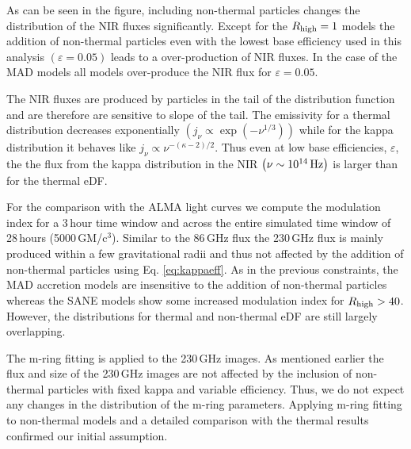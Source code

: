 As can be seen in the figure, including non-thermal particles changes the distribution of the NIR fluxes significantly. Except for the $R_\mathrm{high}=1$ models the addition of non-thermal particles even with the lowest base efficiency used in this analysis $\left( \varepsilon=0.05\right)$ leads to a over-production of NIR fluxes. In the case of the MAD models all models over-produce the NIR flux for $\varepsilon=0.05$.

The NIR fluxes are produced by particles in the tail of the distribution function and are therefore are sensitive to slope of the tail. The emissivity for a thermal distribution decreases exponentially $\left(j_{\nu}\propto\exp(-\nu^{1/3})\right)$ while for the kappa distribution it behaves like $j_{\nu}\propto \nu^{-(\kappa-2)/2}$. Thus even at low base efficiencies, $\varepsilon$, the the flux from the kappa distribution in the NIR $\left(\nu\sim 10^{14}\,\rm{Hz}\right)$ is larger than for the thermal eDF.


For the comparison with the ALMA light curves we compute the modulation index for a 3\,hour time window and across the entire simulated time window of 28\,hours (5000\,GM/c$^3$). Similar to the 86\,GHz flux the 230\,GHz flux is mainly produced within a few gravitational radii and thus not affected by the addition of non-thermal particles using Eq. \ref{eq:kappaeff}. As in the previous constraints, the MAD accretion models are insensitive to the addition of non-thermal particles whereas the SANE models show some increased modulation index for $R_\mathrm{high}>40$. However, the distributions for thermal and non-thermal eDF are still largely overlapping.


The m-ring fitting is applied to the 230\,GHz images. As mentioned earlier the flux and size of the 230\,GHz images are not affected by the inclusion of non-thermal particles with fixed kappa and variable efficiency. Thus, we do not expect any changes in the distribution of the m-ring parameters.  Applying m-ring fitting to non-thermal models and a detailed comparison with the thermal results confirmed our initial assumption. 

